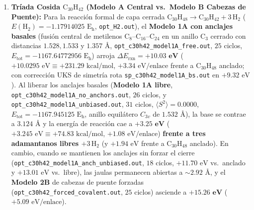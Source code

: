 \documentclass[10pt,twocolumn,a4paper]{article}
\begin{document}
\begin{enumerate}
    \item \textbf{Tríada Cosida $\text{C}_{30}\text{H}_{42}$ (Modelo A Central vs.\ Modelo B Cabezas de Puente):} Para la reacción formal de capa cerrada $\text{C}_{30}\text{H}_{48} \to \text{C}_{30}\text{H}_{42} + 3\,\text{H}_2$ ($E(\text{H}_2) = -1.17914025\text{ E}_\text{h}$, \texttt{opt\_H2.out}), el \textbf{Modelo 1A con anclajes basales} (fusión central de metilenos $\text{C}_8\text{--C}_{16}\text{--C}_{24}$ en un anillo $\text{C}_3$ cerrado con distancias $1.528, 1.533$ y $1.357\text{ \AA}$, \texttt{opt\_c30h42\_model1A\_free.out}, $25$ ciclos, $E_{\text{tot}} = -1167.64772956\text{ E}_\text{h}$) arroja $\Delta E_{\text{rxn}} = \mathbf{+10.03\text{ eV}}$ ($+10.0295\text{ eV} \equiv +231.29\text{ kcal/mol}$, $+3.34\text{ eV/enlace}$ frente a $\text{C}_{30}\text{H}_{48}$ anclado; con corrección UKS de simetría rota \texttt{sp\_c30h42\_model1A\_bs.out} en $+9.32\text{ eV}$). Al liberar los anclajes basales (\textbf{Modelo 1A libre}, \texttt{opt\_c30h42\_model1A\_no\_anchors.out}, $26$ ciclos, y \texttt{opt\_c30h42\_model1A\_unbiased.out}, $31$ ciclos, $\langle S^2\rangle = 0.0000$, $E_{\text{tot}} = -1167.945125\text{ E}_\text{h}$, anillo equilátero $C_{3v}$ de $1.532\text{ \AA}$), la base se contrae a $3.124\text{ \AA}$ y la energía de reacción cae a $\mathbf{+3.25\text{ eV}}$ ($+3.245\text{ eV} \equiv +74.83\text{ kcal/mol}$, $+1.08\text{ eV/enlace}$) \textbf{frente a tres adamantanos libres $+ 3\,\text{H}_2$} (y $+1.94\text{ eV}$ frente a $\text{C}_{30}\text{H}_{48}$ anclado). En cambio, cuando se mantienen los anclajes sin forzar el cierre (\texttt{opt\_c30h42\_model1A\_anch\_unbiased.out}, $18$ ciclos, $+11.70\text{ eV}$ vs.\ anclado y $+13.01\text{ eV}$ vs.\ libre), las jaulas permanecen abiertas a $\sim 2.92\text{ \AA}$, y el \textbf{Modelo 2B} de cabezas de puente forzadas (\texttt{opt\_c30h42\_forced\_covalent.out}, $25$ ciclos) asciende a $\mathbf{+15.26\text{ eV}}$ ($+5.09\text{ eV/enlace}$).

\end{enumerate}
\end{document}

